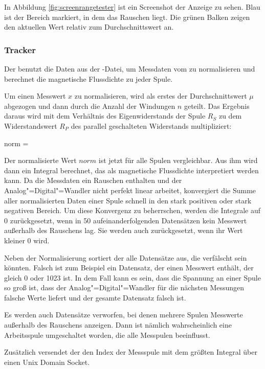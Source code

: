 In Abbildung \ref{fig:screenrangetester} ist ein Screenshot der Anzeige zu sehen.
Blau ist der Bereich markiert, in dem das Rauschen liegt.
Die grünen Balken zeigen den aktuellen Wert relativ zum Durchschnittswert an.

\subsubsection{Tracker}
Der  benutzt die Daten aus der -Datei, um Messdaten vom  zu normalisieren und berechnet die magnetische Flussdichte zu jeder Spule.

Um einen Messwert $x$ zu normalisieren, wird als erstes der Durchschnittswert $\mu$ abgezogen und dann durch die Anzahl der Windungen $n$ geteilt.
Das Ergebnis daraus wird mit dem Verhältnis des Eigenwiderstands der Spule $R_S$ zu dem Widerstandswert $R_P$ des parallel geschalteten Widerstands multipliziert:

\mathematik
norm =  \cdot {}
\mathematikstop

Der normalisierte Wert $norm$ ist jetzt für alle Spulen vergleichbar.
Aus ihm wird dann ein Integral berechnet, das als magnetische Flussdichte interpretiert werden kann.
Da die Messdaten ein Rauschen enthalten und der Analog"=Digital"=Wandler nicht perfekt linear arbeitet, konvergiert die Summe aller normalisierten Daten einer Spule schnell in den stark positiven oder stark negativen Bereich.
Um diese Konvergenz zu beherrschen, werden die Integrale auf 0 zurückgesetzt, wenn in 50  aufeinanderfolgenden Datensätzen kein Messwert außerhalb des Rauschens lag.
Sie werden auch zurückgesetzt, wenn ihr Wert kleiner 0 wird.

Neben der Normalisierung sortiert der  alle Datensätze aus, die verfälscht sein könnten.
Falsch ist zum Beispiel ein Datensatz, der einen Messwert enthält, der gleich 0 oder 1023 ist. In dem Fall kann es sein, dass die Spannung an einer Spule so groß ist, dass der Analog"=Digital"=Wandler für die nächsten Messungen falsche Werte liefert und der gesamte Datensatz falsch ist.

Es werden auch Datensätze verworfen, bei denen mehrere Spulen Messwerte außerhalb des Rauschens anzeigen.
Dann ist nämlich wahrscheinlich eine Arbeitsspule umgeschaltet worden, die alle Messpulen beeinflusst.

Zusätzlich versendet der  den Index der Messspule mit dem größten Integral über einen Unix Domain Socket.

